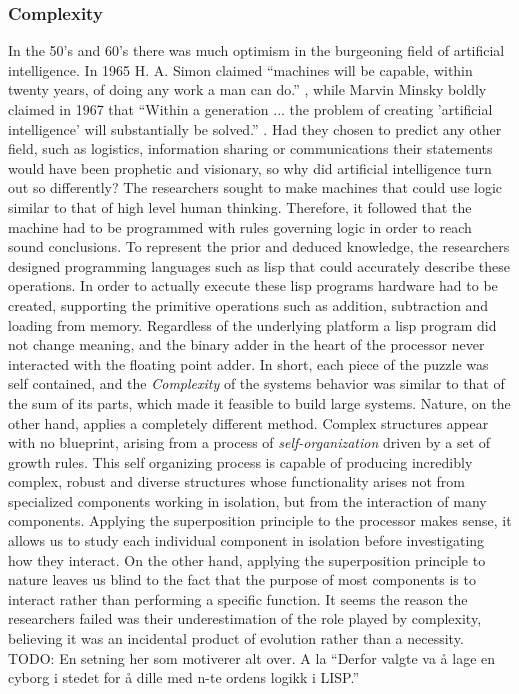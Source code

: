 \subsubsection{Complexity}
In the 50's and 60's there was much optimism in the burgeoning field of
artificial intelligence. In 1965 H. A. Simon claimed ``machines will be capable,
within twenty years, of doing any work a man can
do.''\cite{vardi_artificial_nodate} , while Marvin Minsky boldly claimed in 1967
that ``Within a generation ... the problem of creating 'artificial intelligence'
will substantially be solved.'' \cite{noauthor_marvin_nodate}.
Had they chosen to predict any other field, such as logistics, information
sharing or communications their statements would have been prophetic and
visionary, so why did artificial intelligence turn out so differently?
%
The researchers sought to make machines that could use logic similar to that of
high level human thinking.
%
Therefore, it followed that the machine had to be programmed with rules
governing logic in order to reach sound conclusions.
%
To represent the prior and deduced knowledge, the researchers designed
programming languages such as lisp that could accurately describe these
operations.
%
In order to actually execute these lisp programs hardware had to be created,
supporting the primitive operations such as addition, subtraction and loading
from memory.
%
Regardless of the underlying platform a lisp program did not change meaning, and
the binary adder in the heart of the processor never interacted with the
floating point adder. In short, each piece of the puzzle was self contained,
and the \emph{Complexity} of the systems behavior was similar to that of the sum
of its parts, which made it feasible to build large systems.
%
Nature, on the other hand, applies a completely different method.
Complex structures appear with no blueprint, arising from a process of
\emph{self-organization} driven by a set of growth rules. This self organizing
process is capable of producing incredibly complex, robust and diverse
structures whose functionality arises not from specialized components working in
isolation, but from the interaction of many components.
%
Applying the superposition principle to the processor makes sense, it allows us
to study each individual component in isolation before investigating how they
interact.
%
On the other hand, applying the superposition principle to nature leaves us
blind to the fact that the purpose of most components is to interact rather than
performing a specific function.
It seems the reason the researchers failed was their underestimation of the role
played by complexity, believing it was an incidental product of evolution rather
than a necessity.
TODO: En setning her som motiverer alt over. A la ``Derfor valgte va å lage en
cyborg i stedet for å dille med n-te ordens logikk i LISP.''

